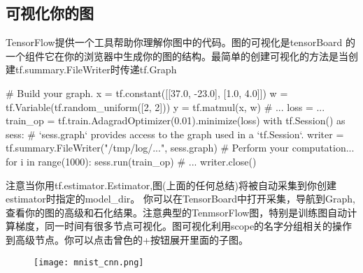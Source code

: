 \subsection{可视化你的图}
TensorFlow提供一个工具帮助你理解你图中的代码。图的可视化是tensorBoard
的一个组件它在你的浏览器中生成你的图的结构。最简单的创建可视化的方法是当创建tf.summary.FileWriter时传递tf.Graph
\begin{python}
# Build your graph.
x = tf.constant([[37.0, -23.0], [1.0, 4.0]])
w = tf.Variable(tf.random_uniform([2, 2]))
y = tf.matmul(x, w)
# ...
loss = ...
train_op = tf.train.AdagradOptimizer(0.01).minimize(loss)
with tf.Session() as sess:
# `sess.graph` provides access to the graph used in a `tf.Session`.
    writer = tf.summary.FileWriter("/tmp/log/...", sess.graph)
# Perform your computation...
for i in range(1000):
    sess.run(train_op)
      # ...
writer.close()
\end{python}
注意当你用tf.estimator.Estimator,图(上面的任何总结)将被自动采集到你创建estimator时指定的model\_dir。
你可以在TensorBoard中打开采集，导航到Graph,查看你的图的高级和石化结果。注意典型的TenmsorFlow图，特别是训练图自动计算梯度，同一时间有很多节点可视化。图可视化利用scope的名字分组相关的操作到高级节点。你可以点击曾色的+按钮展开里面的子图。
\begin{figure}[H]
\texttt{[image: mnist\_cnn.png]}
\end{figure}
